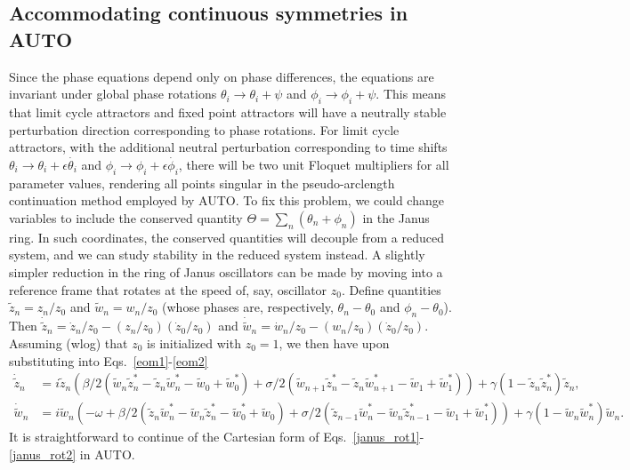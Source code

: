 \documentclass[aps,pre,amsmath,amssymb,floatfix,onecolumn,notitlepage,10pt]{revtex4-1}
\begin{document}
\subsection{Accommodating continuous symmetries in AUTO}
Since the phase equations depend only on phase differences, the equations are invariant under global phase rotations $\theta_i\to\theta_i+\psi$ and $\phi_i\to \phi_i+\psi$.  This means that limit cycle attractors and fixed point attractors will have a neutrally stable perturbation direction corresponding to phase rotations. For limit cycle attractors, with the additional neutral perturbation corresponding to time shifts $\theta_i\to\theta_i+\epsilon\dot{\theta_i}$ and $\phi_i\to\phi_i+\epsilon\dot{\phi_i}$, there will be two unit Floquet multipliers for all parameter values, rendering all points singular in the pseudo-arclength continuation method employed by AUTO. To fix this problem, we could change variables to include the conserved quantity $\Theta = \sum_n \left(\theta_n + \phi_n\right)$ in the Janus ring. In such coordinates, the conserved quantities will decouple from a reduced system, and we can study stability in the reduced system instead.  A slightly simpler reduction in the ring of Janus oscillators can be made by moving into a reference frame that rotates at the speed of, say, oscillator $z_0$. Define quantities $\tilde{z}_n = z_n/z_0$ and $\tilde{w}_n = w_n/z_0$ (whose phases are, respectively, $\theta_n-\theta_0$ and $\phi_n-\theta_0$).  Then $\dot {\tilde z}_n = \dot z_n / z_0 - \left(z_n/z_0\right)\left( \dot z_0/z_0\right)$ and $\dot {\tilde w}_n = \dot w_n / z_0 - \left(w_n/z_0\right) \left(\dot z_0/z_0\right)$. Assuming (wlog) that $z_0$ is initialized with $z_0=1$, we then have upon substituting into Eqs.~\ref{eom1}-\ref{eom2}
\begin{align}
\dot {\tilde z}_n &= i{\tilde z}_n\left(  \beta/2\left({\tilde w}_n{\tilde z}_n^*-{\tilde z}_n{\tilde w}_n^* - {\tilde w}_0+{\tilde w}_0^*\right) + \sigma/2\left({\tilde w}_{n+1}{\tilde z}_n^*-{\tilde z}_n{\tilde w}_{n+1}^* - {\tilde w}_1+{\tilde w}_1^*\right)\right) + \gamma\left(1-{\tilde z}_n{\tilde z}_n^*\right){\tilde z}_n, \label{janus_rot1}\\
\dot {\tilde w}_n &= i{\tilde w}_n\left( -\omega + \beta/2\left({\tilde z}_n{\tilde w}_n^*-{\tilde w}_n{\tilde z}_n^* -{\tilde w}_0^*+{\tilde w}_0 \right) + \sigma/2\left({\tilde z}_{n-1}{\tilde w}_n^*-{\tilde w}_n{\tilde z}_{n-1}^* - {\tilde w}_1+{\tilde w}_1^*\right)\right) + \gamma\left(1-{\tilde w}_n{\tilde w}_n^*\right){\tilde w}_n. \label{janus_rot2}
\end{align}
It is straightforward to continue of the Cartesian form of Eqs.~\eqref{janus_rot1}-\eqref{janus_rot2} in AUTO.
\end{document}
